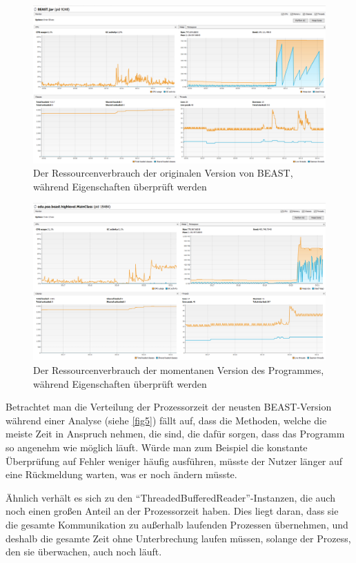 \documentclass[a4paper]{scrreprt}
\begin{document}
\newpage

\begin{figure}[ht]
	\centering
  \includegraphics[width=1.0\textwidth,
  height=0.4\textwidth]{images/OLD_YES.png} \caption{Der Ressourcenverbrauch
 der originalen Version von BEAST, während Eigenschaften überprüft werden}
	\label{fig3}
\end{figure}

\vspace{4cm}

\begin{figure}[ht]
	\centering
  \includegraphics[width=1.0\textwidth,
  height=0.40\textwidth]{images/NEW_YES.png} \caption{Der Ressourcenverbrauch der
  momentanen Version des Programmes, während Eigenschaften überprüft werden}
	\label{fig4}
\end{figure}

\newpage
Betrachtet man die Verteilung der Prozessorzeit der neusten BEAST-Version während einer
Analyse (siehe \ref{fig5}) fällt auf, dass die Methoden, welche die meiste
Zeit in Anspruch nehmen, die sind, die dafür sorgen, dass das Programm
so angenehm wie möglich läuft. Würde man zum Beispiel die konstante
Überprüfung auf Fehler weniger häufig ausführen, müsste der Nutzer länger auf eine
Rückmeldung warten, was er noch ändern müsste. 

Ähnlich verhält es sich zu den
"`ThreadedBufferedReader"'-Instanzen, die auch noch einen großen Anteil an der
Prozessorzeit haben. Dies liegt daran, dass sie die gesamte Kommunikation zu
außerhalb laufenden Prozessen übernehmen, und deshalb die gesamte Zeit ohne
Unterbrechung laufen müssen, solange der Prozess, den sie überwachen, auch noch
läuft.
\end{document}
